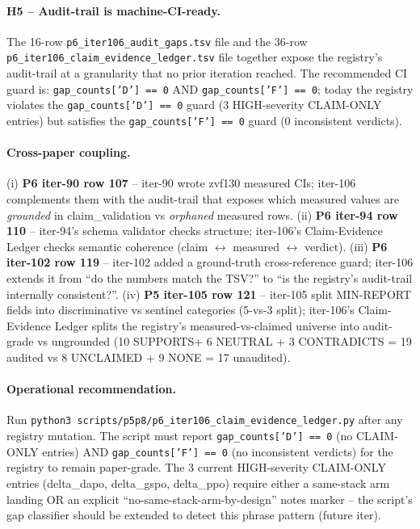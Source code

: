 \paragraph{H5 -- Audit-trail is machine-CI-ready.}
The 16-row \texttt{p6\_iter106\_audit\_gaps.tsv} file and the 36-row
\texttt{p6\_iter106\_claim\_evidence\_ledger.tsv} file together expose
the registry's audit-trail at a granularity that no prior iteration
reached. The recommended CI guard is: \texttt{gap\_counts['D'] == 0} AND
\texttt{gap\_counts['F'] == 0}; today the registry violates the
\texttt{gap\_counts['D'] == 0} guard (3 HIGH-severity CLAIM-ONLY entries)
but satisfies the \texttt{gap\_counts['F'] == 0} guard (0 inconsistent
verdicts).

\paragraph{Cross-paper coupling.}
(i) \textbf{P6 iter-90 row 107} -- iter-90 wrote zvf130 measured CIs;
iter-106 complements them with the audit-trail that exposes which measured
values are \emph{grounded} in claim\_validation vs \emph{orphaned} measured
rows. (ii) \textbf{P6 iter-94 row 110} -- iter-94's schema validator checks
structure; iter-106's Claim-Evidence Ledger checks semantic coherence
(claim $\leftrightarrow$ measured $\leftrightarrow$ verdict). (iii)
\textbf{P6 iter-102 row 119} -- iter-102 added a ground-truth
cross-reference guard; iter-106 extends it from ``do the numbers match the
TSV?'' to ``is the registry's audit-trail internally consistent?''. (iv)
\textbf{P5 iter-105 row 121} -- iter-105 split MIN-REPORT fields into
discriminative vs sentinel categories (5-vs-3 split); iter-106's
Claim-Evidence Ledger splits the registry's measured-vs-claimed universe
into audit-grade vs ungrounded (10 SUPPORTS+ 6 NEUTRAL + 3 CONTRADICTS =
19 audited vs 8 UNCLAIMED + 9 NONE = 17 unaudited).

\paragraph{Operational recommendation.}
Run \texttt{python3 scripts/p5p8/p6\_iter106\_claim\_evidence\_ledger.py}
after any registry mutation. The script must report
\texttt{gap\_counts['D'] == 0} (no CLAIM-ONLY entries) AND
\texttt{gap\_counts['F'] == 0} (no inconsistent verdicts) for the registry
to remain paper-grade. The 3 current HIGH-severity CLAIM-ONLY entries
(delta\_dapo, delta\_gspo, delta\_ppo) require either a same-stack arm
landing OR an explicit ``no-same-stack-arm-by-design'' notes marker -- the
script's gap classifier should be extended to detect this phrase pattern
(future iter).
